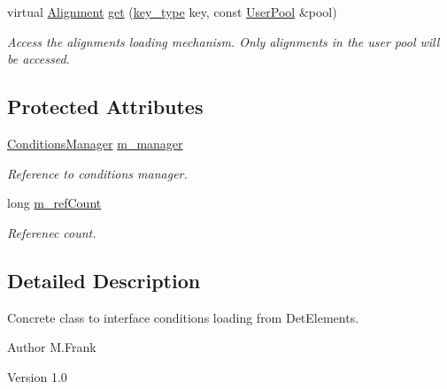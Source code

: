 \begin{DoxyCompactItemize}
virtual \hyperlink{class_d_d4hep_1_1_alignments_1_1_alignment}{Alignment} \hyperlink{class_d_d4hep_1_1_conditions_1_1_alignments_loader_imp_ab37a7e41559862d5c424fcad50bb6768}{get} (\hyperlink{class_d_d4hep_1_1_alignments_1_1_alignments_loader_af56e6294e72dacbe001c1f24b8381d5d}{key\_\-type} key, const \hyperlink{class_d_d4hep_1_1_conditions_1_1_user_pool}{UserPool} \&pool)
\begin{DoxyCompactList}\small\item\em Access the alignments loading mechanism. Only alignments in the user pool will be accessed. \item\end{DoxyCompactList}\end{DoxyCompactItemize}
\subsection*{Protected Attributes}
\begin{DoxyCompactItemize}
\item 
\hyperlink{class_d_d4hep_1_1_conditions_1_1_conditions_manager}{ConditionsManager} \hyperlink{class_d_d4hep_1_1_conditions_1_1_alignments_loader_imp_a448202e08fc26fb95d13fd86993b3685}{m\_\-manager}
\begin{DoxyCompactList}\small\item\em Reference to conditions manager. \item\end{DoxyCompactList}\item 
long \hyperlink{class_d_d4hep_1_1_conditions_1_1_alignments_loader_imp_a806e6a616a116ada0a4a9876c0cc1119}{m\_\-refCount}
\begin{DoxyCompactList}\small\item\em Referenec count. \item\end{DoxyCompactList}\end{DoxyCompactItemize}


\subsection{Detailed Description}
Concrete class to interface conditions loading from DetElements. \begin{DoxyAuthor}{Author}
M.Frank 
\end{DoxyAuthor}
\begin{DoxyVersion}{Version}
1.0 
\end{DoxyVersion}



